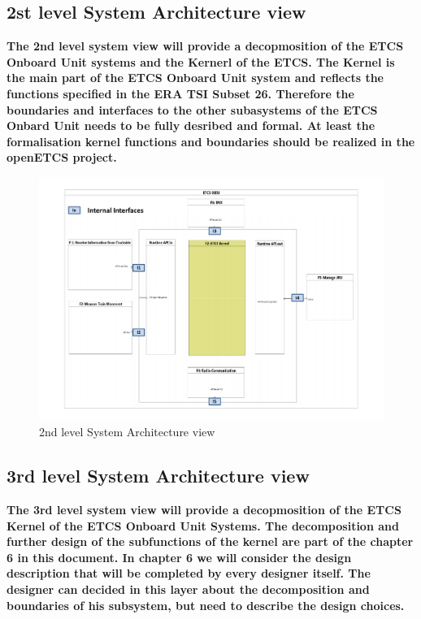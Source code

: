 \newpage
\subsection{2st level System Architecture view}
\textbf{The 2nd level system view will provide a decopmosition of the ETCS Onboard Unit systems and the Kernerl of the ETCS. The Kernel is the main part of the ETCS Onboard Unit system and reflects the functions specified in the ERA TSI Subset 26. Therefore the boundaries and interfaces to the other subasystems of the ETCS Onbard Unit needs to be fully desribed and formal. At least the formalisation kernel functions and boundaries should be realized in the openETCS project.}

\begin{figure}[h]
\centering
\includegraphics[scale=0.6]{images/2ndLevelSystem}
\caption{2nd level System Architecture view}
\label{2nd level System Architecture view}
\end{figure}

\subsection{3rd level System Architecture view}
\textbf{The 3rd level system view will provide a decopmosition of the ETCS Kernel of the ETCS Onboard Unit Systems. The decomposition and further design of the subfunctions of the kernel are part of the chapter 6 in this document. In chapter 6 we will consider the design description that will be completed by every designer itself. The designer can decided in this layer about the decomposition and boundaries of his subsystem, but need to describe the design choices.}

